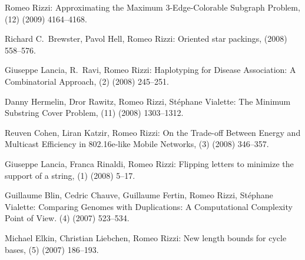 \begin{etaremune}
  \item {\sc Romeo Rizzi:}
   \newblock   Approximating the Maximum $3$-Edge-Colorable Subgraph Problem,
   (12) (2009) 4164--4168.

  \item {\sc Richard C.~Brewster, Pavol Hell, Romeo Rizzi:}
   \newblock  Oriented star packings,
    (2008) 558--576.

  \item {\sc Giuseppe Lancia, R.~Ravi, Romeo Rizzi:}
   \newblock  Haplotyping for Disease Association: A Combinatorial Approach, 
   (2) (2008) 245--251.

  \item {\sc Danny Hermelin, Dror Rawitz, Romeo Rizzi, St\'ephane Vialette:}
   \newblock  The Minimum Substring Cover Problem,
   (11) (2008) 1303--1312.

  \item {\sc Reuven Cohen, Liran Katzir, Romeo Rizzi:}
   \newblock   On the Trade-off Between Energy and Multicast Efficiency in 802.16e-like Mobile Networks,
   (3) (2008) 346--357.

  \item {\sc Giuseppe Lancia, Franca Rinaldi, Romeo Rizzi:}
   \newblock  Flipping letters to minimize the support of a string,
   (1) (2008) 5--17.

  \item {\sc Guillaume Blin, Cedric Chauve, Guillaume Fertin, Romeo Rizzi, St\'ephane Vialette:}
   \newblock  Comparing Genomes with Duplications: A Computational Complexity Point of View.
   (4) (2007) 523--534.

  \item {\sc Michael Elkin, Christian Liebchen, Romeo Rizzi:}
   \newblock  New length bounds for cycle bases,
   (5) (2007) 186--193.


\end{etaremune}
